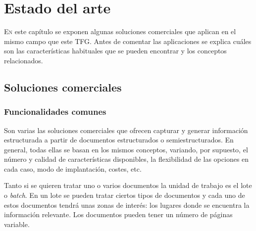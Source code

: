 
\chapter{Estado del arte}
\label{chap:estado-arte}

\lettrine{E}{n} este capítulo se exponen algunas soluciones comerciales que aplican en el mismo campo que este TFG. Antes de comentar las aplicaciones se explica cuáles son las características habituales que se pueden encontrar y los conceptos relacionados.

\section{Soluciones comerciales}

\subsection{Funcionalidades comunes}

Son varias las soluciones comerciales que ofrecen capturar y generar información estructurada a partir de documentos estructurados o semiestructurados. En general, todas ellas se basan en los mismos conceptos, variando, por supuesto, el número y calidad de características disponibles, la flexibilidad de las opciones en cada caso, modo de implantación, costes, etc.

Tanto si se quieren tratar uno o varios documentos la unidad de trabajo es el lote o \emph{batch}. En un lote se pueden tratar ciertos tipos de documentos y cada uno de estos documentos tendrá unas zonas de interés: los lugares donde se encuentra la información relevante. Los documentos pueden tener un número de páginas variable.

